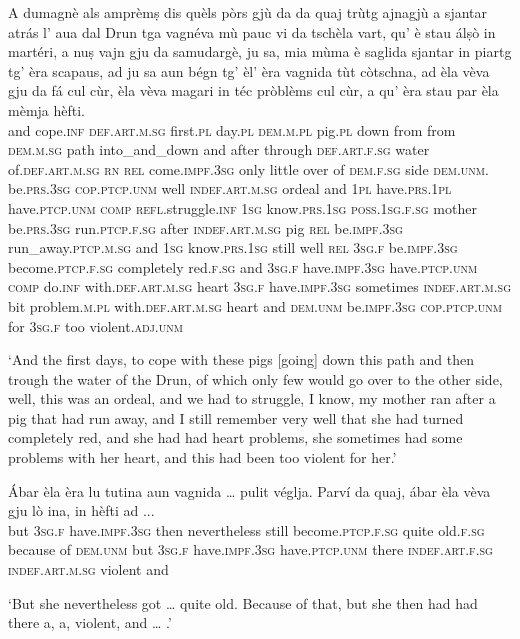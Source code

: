 \begin{linenumbers}
\gll    A dumagnè als amprèmṣ dis quèls pòrs gjù da da quaj trùtg ajnagjù a sjantar atrás l’ aua dal Drun tga vagnéva mù pauc vi da tschèla vart, qu’ è stau álṣò in martéri, a nuṣ vajn gju da samudargè, ju sa, mia mùma è saglida sjantar in piartg tg’ èra scapaus, ad ju sa aun bégn tg’ èl’ èra vagnida tùt còtschna, ad èla vèva gju da fá cul cùr, èla vèva magari in téc pròblèms cul cùr, a qu’ èra stau par èla mèmja hèfti.\\
and cope.\textsc{inf} \textsc{def.art.m.sg} first.\textsc{pl}  day.\textsc{pl} \textsc{dem.m.pl}  pig.\textsc{pl} down from from \textsc{dem.m.sg} path into\_and\_down and after through  \textsc{def.art.f.sg} water of.\textsc{def.art.m.sg}  \textsc{rn} \textsc{rel} come.\textsc{impf.3sg} only little over of \textsc{dem.f.sg} side \textsc{dem.unm.} be.\textsc{prs.3sg} \textsc{cop.ptcp.unm} well \textsc{indef.art.m.sg} ordeal and \textsc{1pl} have.\textsc{prs.1pl} have.\textsc{ptcp.unm} \textsc{comp}  \textsc{refl.}struggle.\textsc{inf} \textsc{1sg} know.\textsc{prs.1sg} \textsc{poss.1sg.f.sg} mother be.\textsc{prs.3sg} run.\textsc{ptcp.f.sg} after \textsc{indef.art.m.sg} pig \textsc{rel} be.\textsc{impf.3sg} run\_away.\textsc{ptcp.m.sg} and \textsc{1sg} know.\textsc{prs.1sg} still well \textsc{rel} \textsc{3sg.f} be.\textsc{impf.3sg} become.\textsc{ptcp.f.sg} completely red.\textsc{f.sg} and \textsc{3sg.f} have.\textsc{impf.3sg} have.\textsc{ptcp.unm} \textsc{comp} do.\textsc{inf} with.\textsc{def.art.m.sg} heart \textsc{3sg.f} have.\textsc{impf.3sg} sometimes \textsc{indef.art.m.sg} bit problem.\textsc{m.pl} with.\textsc{def.art.m.sg} heart and \textsc{dem.unm}  be.\textsc{impf.3sg} \textsc{cop.ptcp.unm} for \textsc{3sg.f} too violent.\textsc{adj.unm} \\
\end{linenumbers}
\medskip
\glt `And the first days, to cope with these pigs [going] down this path and then trough the water of the Drun, of which only few would go over to the other side, well, this was an ordeal, and we had to struggle, I know, my mother ran after a pig that had run away, and I still remember very well that she had turned completely red, and she had had heart problems, she sometimes had some problems with her heart, and this had been too violent for her.'
\medskip

\begin{linenumbers}
\gll    Ábar èla èra lu tutina aun vagnida … pulit véglja. Parví da quaj, ábar èla vèva gju lò ina, in hèfti ad ...\\
but \textsc{3sg.f} have.\textsc{impf.3sg} then nevertheless still become.\textsc{ptcp.f.sg} {} quite old.\textsc{f.sg} because of  \textsc{dem.unm} but \textsc{3sg.f}  have.\textsc{impf.3sg} have.\textsc{ptcp.unm} there \textsc{indef.art.f.sg} \textsc{indef.art.m.sg} violent and\\
\end{linenumbers}
\medskip
\glt `But she nevertheless got … quite old. Because of that, but she then had had there a, a, violent, and … .'
\medskip

